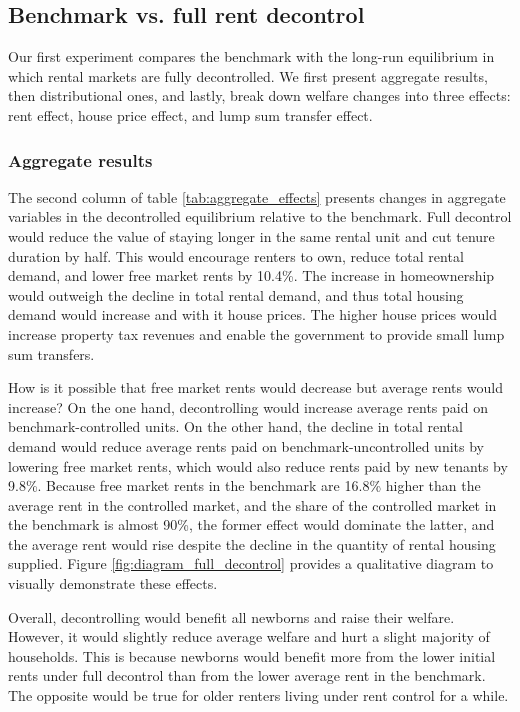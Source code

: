 \documentclass[parskip=full]{article}
\begin{document}
\subsection{Benchmark vs. full rent decontrol}\label{subsection:full_decontrol}
Our first experiment compares the benchmark with the long-run equilibrium in which rental markets are fully decontrolled. We first present aggregate results, then distributional ones, and lastly, break down welfare changes into three effects: rent effect, house price effect, and lump sum transfer effect.

\subsubsection{Aggregate results} The second column of table \ref{tab:aggregate_effects} presents changes in aggregate variables in the decontrolled equilibrium relative to the benchmark. Full decontrol would reduce the value of staying longer in the same rental unit and cut tenure duration by half. This would encourage renters to own, reduce total rental demand, and lower free market rents by 10.4\%. The increase in homeownership would outweigh the decline in total rental demand, and thus total housing demand would increase and with it house prices. The higher house prices would increase property tax revenues and enable the government to provide small lump sum transfers.

How is it possible that free market rents would decrease but average rents would increase? On the one hand, decontrolling would increase average rents paid on benchmark-controlled units. On the other hand, the decline in total rental demand would reduce average rents paid on benchmark-uncontrolled units by lowering free market rents, which would also reduce rents paid by new tenants by 9.8\%. Because free market rents in the benchmark are 16.8\% higher than the average rent in the controlled market, and the share of the controlled market in the benchmark is almost 90\%, the former effect would dominate the latter, and the average rent would rise despite the decline in the quantity of rental housing supplied. Figure \ref{fig:diagram_full_decontrol} provides a qualitative diagram to visually demonstrate these effects. %

Overall, decontrolling would benefit all newborns and raise their welfare. However, it would slightly reduce average welfare and hurt a slight majority of households. This is because newborns would benefit more from the lower initial rents under full decontrol than from the lower average rent in the benchmark. The opposite would be true for older renters living under rent control for a while. 
\end{document}
